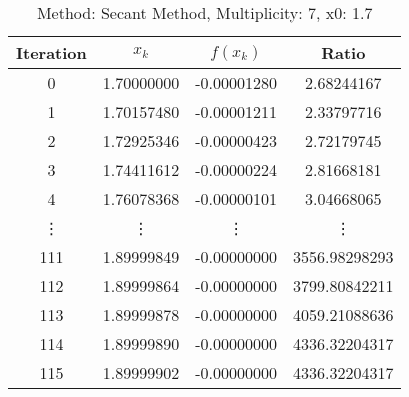 \begin{table}
\centering
\caption{Method: Secant Method, Multiplicity: 7, x0: 1.7}
\label{tab:table_Secant_Method_7_1_7}
\begin{tabular}{c c c c}
\toprule
Iteration &      $x_k$ &    $f(x_k)$ &         Ratio \\
\midrule
        0 & 1.70000000 & -0.00001280 &    2.68244167 \\
        1 & 1.70157480 & -0.00001211 &    2.33797716 \\
        2 & 1.72925346 & -0.00000423 &    2.72179745 \\
        3 & 1.74411612 & -0.00000224 &    2.81668181 \\
        4 & 1.76078368 & -0.00000101 &    3.04668065 \\
   \vdots &     \vdots &      \vdots &        \vdots \\
      111 & 1.89999849 & -0.00000000 & 3556.98298293 \\
      112 & 1.89999864 & -0.00000000 & 3799.80842211 \\
      113 & 1.89999878 & -0.00000000 & 4059.21088636 \\
      114 & 1.89999890 & -0.00000000 & 4336.32204317 \\
      115 & 1.89999902 & -0.00000000 & 4336.32204317 \\
\bottomrule
\end{tabular}
\end{table}
